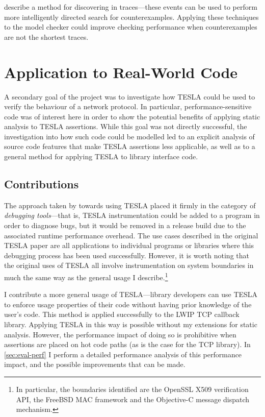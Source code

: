 \textcite{kashyap_producing_2008} describe a method for discovering
 in traces---these events can be used to perform more
intelligently directed search for counterexamples. Applying these techniques to
the model checker could improve checking performance when counterexamples are
not the shortest traces.

\section{Application to Real-World Code} \label{sec:eval-app}

A secondary goal of the project was to investigate how TESLA could be used to
verify the behaviour of a network protocol. In particular, performance-sensitive
code was of interest here in order to show the potential benefits of applying
static analysis to TESLA assertions. While this goal was not directly
successful, the investigation into how such code could be modelled led to an
explicit analysis of source code features that make TESLA assertions less
applicable, as well as to a general method for applying TESLA to library
interface code.

\subsection{Contributions}

The approach taken by \textcite{anderson_tesla:_2014} towards using TESLA placed
it firmly in the category of \emph{debugging tools}---that is, TESLA
instrumentation could be added to a program in order to diagnose bugs, but it
would be removed in a release build due to the associated runtime performance
overhead. The use cases described in the original TESLA paper are all
applications to individual programs or libraries where this debugging process
has been used successfully. However, it is worth noting that the original uses
of TESLA all involve instrumentation on system boundaries in much the same way
as the general usage I describe.\footnote{In particular, the boundaries
identified are the OpenSSL X509 verification API, the FreeBSD MAC framework and
the Objective-C message dispatch mechanism.}

I contribute a more general usage of TESLA---library developers can use TESLA to
enforce usage properties of their code without having prior knowledge of the
user's code. This method is applied successfully to the LWIP TCP callback
library. Applying TESLA in this way is possible without my extensions for static
analysis. However, the performance impact of doing so is prohibitive when
assertions are placed on hot code paths (as is the case for the TCP
library). In \autoref{sec:eval-perf} I perform a detailed performance analysis
of this performance impact, and the possible improvements that can be made.

